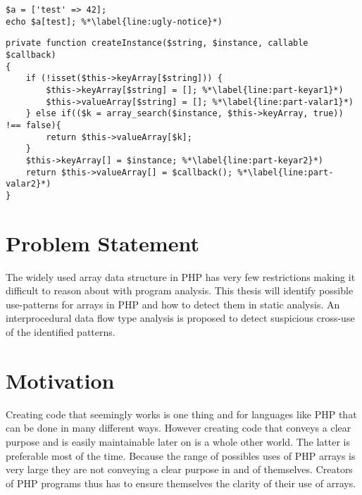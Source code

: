 \begin{program}
\centering 
\begin{lstlisting}
$a = ['test' => 42];
echo $a[test]; %*\label{line:ugly-notice}*)
\end{lstlisting}
\caption{Valid, but ugly, program \label{prog:ugly}}
\end{program}


\begin{program}
\centering 
\begin{lstlisting}
private function createInstance($string, $instance, callable $callback)
{
    if (!isset($this->keyArray[$string])) {
        $this->keyArray[$string] = []; %*\label{line:part-keyar1}*)
        $this->valueArray[$string] = []; %*\label{line:part-valar1}*)
    } else if(($k = array_search($instance, $this->keyArray, true)) !== false){
        return $this->valueArray[$k];
    }
    $this->keyArray[] = $instance; %*\label{line:part-keyar2}*)
    return $this->valueArray[] = $callback(); %*\label{line:part-valar2}*)
}
\end{lstlisting}
\caption{Other type}
\end{program}

\section{Problem Statement}
The widely used array data structure in PHP has very few restrictions making it difficult to reason about with program analysis. This thesis will identify possible use-patterns for arrays in PHP and how to detect them in static analysis. An interprocedural data flow type analysis is proposed to detect suspicious cross-use of the identified patterns.

\section{Motivation}
Creating code that seemingly works is one thing and for languages like PHP that can be done in many different ways. However creating code that conveys a clear purpose and is easily maintainable later on is a whole other world. The latter is preferable most of the time. Because the range of possibles uses of PHP arrays is very large they are not conveying a clear purpose in and of themselves. Creators of PHP programs thus has to ensure themselves the clarity of their use of arrays. 

